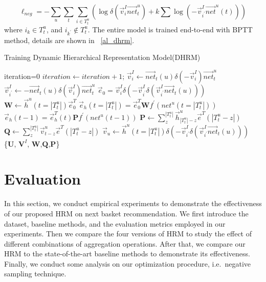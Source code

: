 \documentclass[10pt,journal,compsoc]{IEEEtran}
\begin{document}
\begin{displaymath}
\ell_{neg} = -\sum_u\sum_t\sum_{i\in T^u_t}(\log \delta(\vec{v}^I_i\vec{net}^u_t)+k\sum\log(-\vec{v}^I_{i^{'}}\vec{net}^u(t)))
\end{displaymath}
where $i_k\in T^u_t$, and $i_{k^{'}}\not\in T^u_t$.
The entire model is trained end-to-end with BPTT method, details are shown in ~\ref{al_dhrm}.
\begin{algorithm}
    \caption{Training Dynamic Hierarchical Representation Model(DHRM)}  \label{al_dhrm}
    \begin{algorithmic}[1]
        \State iteration=0
        \Repeat
        \State $iteration\leftarrow iteration+1$;
            \State $\vec{v}^I_i \leftarrow \vec{net}_t(u)\delta(-\vec{v}^I_i)\vec{net}^u_{t}$
            \State $\vec{v}^I_{i^{'}} \leftarrow -\vec{net}_t(u)\delta(\vec{v}^I_i)\vec{net}^u_{t}$
            \State $\vec{e}_0=\vec{v}^I_i\delta(-\vec{v}^I_{i^{'}}\delta(\vec{v}^I_{i^{'}}\vec{net}_t(u)))$
            \State $\textbf{W} \leftarrow \vec{h}^u(t=|T^u_t|)\vec{e}^T_0$
            \State $\vec{e}_h(t=|T^u_t|)=\vec{e}^T_0\textbf{W}f^{'}(net^u(t=|T^u_t|))$
            \State$\vec{e}_h(t-1)=\vec{e}^T_h(t)\textbf{P}f^{'}(net^u(t-1))$
            \EndFor
            \State $\textbf{P}\leftarrow \sum^{|T^u_t|}_z \vec{h}^u_{|T^u_t|-z}\vec{e}^T(|T^u_t-z|)$
            \State $\textbf{Q}\leftarrow \sum^{|T^u_t|}_z \vec{v}^u_{t-z}\vec{e}^T(|T^u_t-z|)$
            \EndFor
            \State $\vec{v}_u \leftarrow \vec{h}^u(t=|T^u_t|)\delta(-\vec{v}^I_{i^{'}}\delta(\vec{v}^I_{i^{'}}\vec{net}_t(u)))$
            \EndFor
             \\
         \Return \{$\textbf{U}$, $\textbf{V}^I$, $\textbf{W}$,$\textbf{Q}$,$\textbf{P}$\}
    \end{algorithmic}
\end{algorithm}
\section{Evaluation}
In this section, we conduct empirical experiments to demonstrate the effectiveness of our proposed HRM on next basket recommendation. We first introduce the dataset, baseline methods, and the evaluation metrics employed in our experiments. Then we compare the four versions of HRM to study the effect of different combinations of aggregation operations. After that, we compare our HRM to the state-of-the-art baseline methods to demonstrate its effectiveness. Finally, we conduct some analysis on our optimization procedure, i.e.~negative sampling technique.
\end{document}
